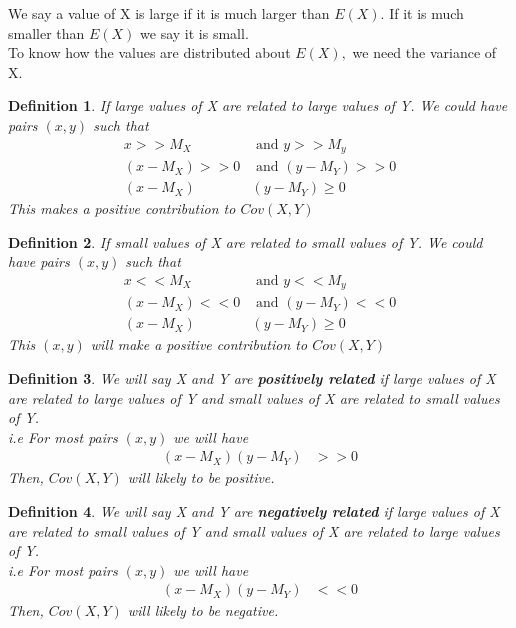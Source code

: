 \documentclass[11pt,oneside]{book}
\theoremstyle{break}
\theoremstyle{break}
\newtheorem{defn}{Definition}[corL]
\begin{document}
We say a value of X is large if it is much larger than $E(X)$. If it is much smaller than $E(X)$ we say it is small.
\hfill\\
To know how the values are distributed about $E(X),$ we need the variance of X. 
\begin{defn}
If large values of X are related to large values of Y. We could have pairs $(x,y)$ such that \begin{align*}
x>>M_X &\text{ and }y>>M_y\\
(x-M_X)>>0 &\text{ and }(y-M_Y)>>0\\
(x-M_X)&(y-M_Y)\geq 0
\end{align*}
This makes a positive contribution to $Cov(X,Y)$
\end{defn}
\begin{defn}
If small values of X are related to small values of Y. We could have pairs $(x,y)$ such that \begin{align*}
x<<M_X &\text{ and }y<<M_y\\
(x-M_X)<<0 &\text{ and }(y-M_Y)<<0\\
(x-M_X)&(y-M_Y)\geq 0
\end{align*}
This $(x,y)$ will make a positive contribution to $Cov(X,Y)$
\end{defn}
\begin{defn}
We will say X and Y are \textbf{positively related} if large values of X are related to large values of Y and small values of X are related to small values of Y. \\
i.e For most pairs $(x,y)$ we will have \begin{align*}
(x-M_X)(y-M_Y)&>>0
\end{align*}
Then, $Cov(X,Y)$ will likely to be positive.
\end{defn}
\begin{defn}
We will say X and Y are \textbf{negatively related} if large values of X are related to small values of Y and small values of X are related to large values of Y. \\
i.e For most pairs $(x,y)$ we will have \begin{align*}
(x-M_X)(y-M_Y)&<<0
\end{align*}
Then, $Cov(X,Y)$ will likely to be negative.
\end{defn}
\end{document}
